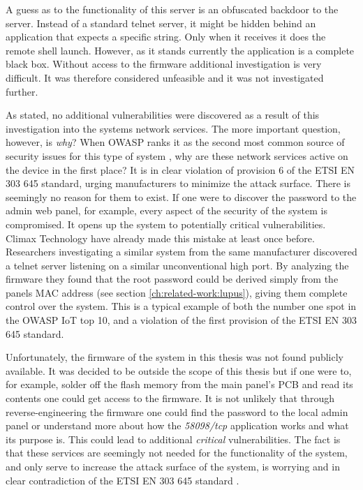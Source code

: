 A guess as to the functionality of this server is an obfuscated backdoor to the server. Instead of a standard telnet server, it might be hidden behind an application that expects a specific string. Only when it receives it does the remote shell launch. However, as it stands currently the application is a complete black box. Without access to the firmware additional investigation is very difficult. It was therefore considered unfeasible and it was not investigated further.

As stated, no additional vulnerabilities were discovered as a result of this investigation into the systems network services. The more important question, however, is \textit{why}? When OWASP ranks it as the second most common source of security issues for this type of system \cite{owasp-iot-top10}, why are these network services active on the device in the first place? It is in clear violation of provision 6 of the ETSI EN 303 645 standard, urging manufacturers to minimize the attack surface. There is seemingly no reason for them to exist. If one were to discover the password to the admin web panel, for example, every aspect of the security of the system is compromised. It opens up the system to potentially critical vulnerabilities. Climax Technology have already made this mistake at least once before. Researchers investigating a similar system from the same manufacturer discovered a telnet server listening on a similar unconventional high port. By analyzing the firmware they found that the root password could be derived simply from the panels MAC address \cite{labvienna} (see section \ref{ch:related-work:lupus}), giving them complete control over the system. This is a typical example of both the number one spot in the OWASP IoT top 10, and a violation of the first provision of the ETSI EN 303 645 standard.

Unfortunately, the firmware of the system in this thesis was not found publicly available. It was decided to be outside the scope of this thesis but if one were to, for example, solder off the flash memory from the main panel's PCB and read its contents one could get access to the firmware. It is not unlikely that through reverse-engineering the firmware one could find the password to the local admin panel or understand more about how the \textit{58098/tcp} application works and what its purpose is. This could lead to additional \textit{critical} vulnerabilities. The fact is that these services are seemingly not needed for the functionality of the system, and only serve to increase the attack surface of the system, is worrying and in clear contradiction of the ETSI EN 303 645 standard \cite{etsi-iot-standard}.
